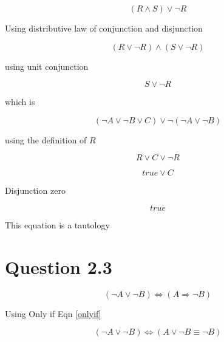 \documentclass[10pt,a4paper]{article}
\begin{document}
\begin{equation}
 (R \wedge S) \vee \neg R
\end{equation}

Using distributive law of conjunction and disjunction

\begin{equation}
 (R \vee \neg R) \wedge (S\vee \neg R) 
\end{equation}

using unit conjunction 

\begin{equation}
 S \vee \neg R
\end{equation}

which is 

\begin{equation}
(\neg A\vee\neg B\vee C) \vee \neg(\neg A \vee \neg B)
\end{equation}

using the definition of $R$

\begin{equation}
 R \vee C \vee \neg R
\end{equation}

\begin{equation}
 true \vee C
\end{equation}

Disjunction zero

\begin{equation}
 true
\end{equation}

This equation is a tautology













\section{Question 2.3}
\begin{equation}
(\neg A \vee \neg B )  \Leftrightarrow (A \Rightarrow \neg B)
\end{equation}

Using Only if Eqn \ref{onlyif}

\begin{equation}
(\neg A \vee \neg B )  \Leftrightarrow (A \vee \neg B \equiv \neg B)
\end{equation}
\end{document}
